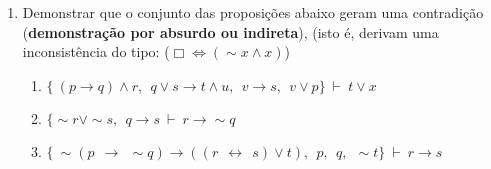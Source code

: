 \documentclass[12pt, a4paper,final]{article}
\begin{document}
\begin{enumerate}
\begin{enumerate}
\begin{comment}
PRONTAS PARA o FUTURO

\item $\{ p \vee q \rightarrow r,~ s \rightarrow \sim r \wedge \sim t,~ s \vee u \} ~\vdash~ p \rightarrow u$

\item $\{ p \rightarrow q,~ r \rightarrow t,~ s \rightarrow r,~ p \vee s \} ~\vdash~ \sim q \rightarrow t $

\end{comment}


\end{enumerate}



\item Demonstrar que o conjunto das proposi\c c\~oes abaixo geram uma contradi\c c\~ao ({\bf demons\-tra\c c\~ao por absurdo ou indireta}),  (isto \'e, derivam uma inconsist\^encia do tipo: ($\Box \Leftrightarrow (\sim x \wedge x)$)

\begin{enumerate}


\item $\{\ (p \rightarrow q) \wedge r,\:\: q \vee s \rightarrow t \wedge u,\:\: v \rightarrow s,\:\: v \vee p \} ~\vdash~  t \vee x $






\item $\{ \sim r \vee \sim s, \:\: q \rightarrow s ~\vdash~ r \rightarrow \sim q$


\item $\{\ \sim (p\:\: \rightarrow \:\: \sim q) \rightarrow ((r \:\: \leftrightarrow \:\: s) \vee t),\:\:  p,\:\:  q,\:\:  \sim t    \} ~\vdash~   r \rightarrow s $

\end{enumerate}

\end{enumerate}
\end{document}
